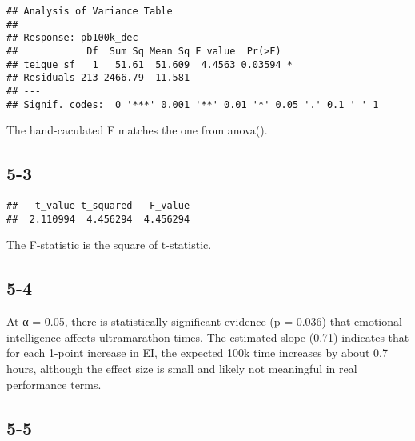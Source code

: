 \documentclass[
]{article}
\newenvironment{Shaded}{\begin{snugshade}}{\end{snugshade}}
\newcommand{\AttributeTok}[1]{\textcolor[rgb]{0.13,0.29,0.53}{#1}}
\newcommand{\DecValTok}[1]{\textcolor[rgb]{0.00,0.00,0.81}{#1}}
\newcommand{\FunctionTok}[1]{\textcolor[rgb]{0.13,0.29,0.53}{\textbf{#1}}}
\newcommand{\NormalTok}[1]{#1}
\newcommand{\OtherTok}[1]{\textcolor[rgb]{0.56,0.35,0.01}{#1}}
\newcommand{\SpecialCharTok}[1]{\textcolor[rgb]{0.81,0.36,0.00}{\textbf{#1}}}
\newcommand{\StringTok}[1]{\textcolor[rgb]{0.31,0.60,0.02}{#1}}
\begin{document}
\begin{verbatim}
## Analysis of Variance Table
## 
## Response: pb100k_dec
##            Df  Sum Sq Mean Sq F value  Pr(>F)  
## teique_sf   1   51.61  51.609  4.4563 0.03594 *
## Residuals 213 2466.79  11.581                  
## ---
## Signif. codes:  0 '***' 0.001 '**' 0.01 '*' 0.05 '.' 0.1 ' ' 1
\end{verbatim}

The hand-caculated F matches the one from anova().

\subsection{5-3}\label{section-24}

\begin{Shaded}
\end{Shaded}

\begin{verbatim}
##   t_value t_squared   F_value 
##  2.110994  4.456294  4.456294
\end{verbatim}

The F-statistic is the square of t-statistic.

\subsection{5-4}\label{section-25}

At α = 0.05, there is statistically significant evidence (p = 0.036)
that emotional intelligence affects ultramarathon times. The estimated
slope (0.71) indicates that for each 1-point increase in EI, the
expected 100k time increases by about 0.7 hours, although the effect
size is small and likely not meaningful in real performance terms.

\subsection{5-5}\label{section-26}
\end{document}
